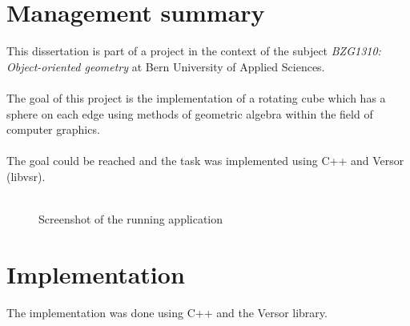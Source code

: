 \documentclass[pdftex,12pt,a4paper]{article}
\begin{document}


\newpage

\section{Management summary}

This dissertation is part of a project in the context of the subject \textit{BZG1310: Object-oriented geometry} at Bern University of Applied Sciences.
\\
\\
The goal of this project is the implementation of a rotating cube which has a sphere on each edge using methods of \gls{geometric algebra} within the field of computer graphics.
\\
\\
The goal could be reached and the task was implemented using C++ and \gls{Versor (libvsr)}.\\
\\
\begin{figure}[htbp]
\centering {}
\caption{Screenshot of the running application \label{fig:screenshot}}
\end{figure}

\section{Implementation}

The implementation was done using C++ and the Versor library.
\end{document}
